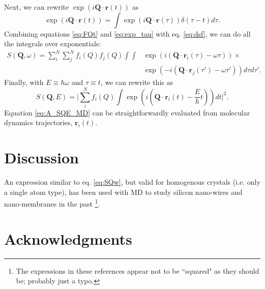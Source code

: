 \documentclass[11pt,prb,aps,nofootinbib,superscriptaddress,floatfix]{revtex4-2}
\begin{document}
Next, we can rewrite $\exp(i\bm{Q}\cdot\bm{r}(t))$ as
\begin{equation}
    \exp(i\bm{Q}\cdot\bm{r}(t))=\int \exp(i\bm{Q}\cdot\bm{r}(\tau)) \delta(\tau-t)d\tau.
    \label{eq:exp_tau}
\end{equation}
Combining equations \ref{eq:FQt} and \ref{eq:exp_tau} with eq. \ref{eq:dsf}, we can do all the integrals over exponentials:
\begin{equation}
    \begin{split}
    S(\bm{Q},\omega) = \sum_i^N \sum_j^N f_i(Q) f_j(Q) \int \int & \exp (i(\bm{Q}\cdot \bm{r}_i(\tau)-\omega\tau))  \times  \\
    & \exp (-i(\bm{Q}\cdot \bm{r}_j(\tau')-\omega\tau')) d\tau d\tau' .
    \end{split}
    \label{eq:SQw}
\end{equation}
Finally, with $E\equiv\hbar\omega$ and $\tau\equiv t$, we can rewrite this as
\begin{equation}
    S(\bm{Q},E) = \Big \lvert \sum_i^N f_i(Q)\int \exp (i(\bm{Q}\cdot \bm{r}_i(t)-\frac{E}{\hbar}t))dt \Big \rvert^2.
    \label{eq:A_SQE_MD}
\end{equation}
Equation \ref{eq:A_SQE_MD} can be straightforwardly evaluated from molecular dynamics trajectories, $\bm{r}_i(t)$.

\section{Discussion}
An expression similar to eq. \ref{eq:SQw}, but valid for homogenous crystals (i.e. only a single atom type), has been used with MD to study silicon nano-wires and nano-membranes in the past \cite{zushi2015effect,xiong2017native}\footnote{The expressions in these references appear not to be ``squared" as they should be; probably just a typo.}.


\section{Acknowledgments}




\end{document}
